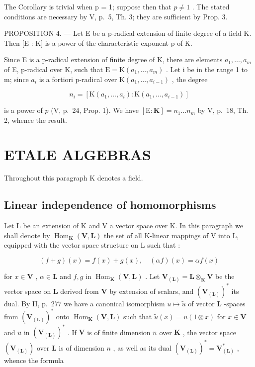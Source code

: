 The Corollary is trivial when p = 1; suppose then that \(p \neq 1\) . The stated conditions are necessary by V, p.~5, Th. 3; they are sufficient by Prop. 3.

PROPOSITION 4. --- Let E be a p-radical extension of finite degree of a field K. Then {[}E : K{]} is a power of the characteristic exponent p of K.

Since E is a p-radical extension of finite degree of K, there are elements \(a_{1}, \ldots, a_{m}\) of E, p-radical over K, such that \(\mathrm{E} = \mathrm{K}(a_{1}, \ldots, a_{m})\) . Let i be in the range 1 to m; since \(a_{i}\) is a fortiori p-radical over \(\mathrm{K}(a_{1}, \ldots, a_{i-1})\) , the degree

\[
n _ {i} = \left[ \mathrm{K} (a _ {1}, \dots , a _ {i}): \mathrm{K} (a _ {1}, \dots , a _ {i - 1}) \right]
\]

is a power of \(p\) (V, p.~24, Prop. 1). We have \([\mathrm{E}:\mathbf{K}] = n_1\ldots n_m\) by V, p.~18, Th. 2, whence the result.

\section{ETALE ALGEBRAS}

Throughout this paragraph K denotes a field.

\subsection{Linear independence of homomorphisms}

Let L be an extension of K and V a vector space over K. In this paragraph we shall denote by \(\operatorname{Hom}_{\mathbf{K}}(\mathbf{V},\mathbf{L})\) the set of all K-linear mappings of V into L, equipped with the vector space structure on L such that :

\[
(f + g) (x) = f (x) + g (x), \quad (\alpha f) (x) = \alpha f (x)\tag{1}
\]

for \(x \in \mathbf{V}\) , \(\alpha \in \mathbf{L}\) and \(f, g\) in \(\operatorname{Hom}_{\mathbf{K}}(\mathbf{V}, \mathbf{L})\) . Let \(\mathbf{V}_{(\mathbf{L})} = \mathbf{L} \otimes_{\mathbf{K}} \mathbf{V}\) be the vector space on \(\mathbf{L}\) derived from \(\mathbf{V}\) by extension of scalars, and \((\mathbf{V}_{(\mathbf{L})})^*\) its dual. By II, p.~277 we have a canonical isomorphism \(u \mapsto \tilde{u}\) of vector \(\mathbf{L}\) -spaces from \((\mathbf{V}_{(\mathbf{L})})^*\) onto \(\operatorname{Hom}_{\mathbf{K}}(\mathbf{V}, \mathbf{L})\) such that \(\tilde{u}(x) = u(1 \otimes x)\) for \(x \in \mathbf{V}\) and \(u\) in \((\mathbf{V}_{(\mathbf{L})})^*\) . If \(\mathbf{V}\) is of finite dimension \(n\) over \(\mathbf{K}\) , the vector space \((\mathbf{V}_{(\mathbf{L})})\) over \(\mathbf{L}\) is of dimension \(n\) , as well as its dual \((\mathbf{V}_{(\mathbf{L})})^* = \mathbf{V}_{(\mathbf{L})}^*\) , whence the formula

